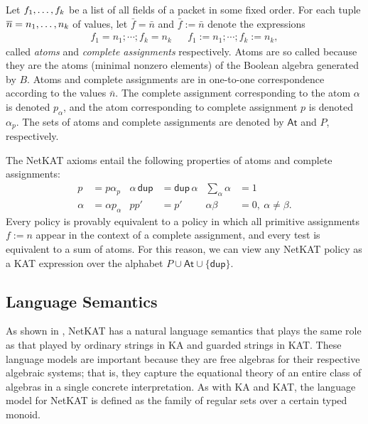 \documentclass{article}
\newcommand\cset[1]{\{#1\}}
\newcommand\CA{\ensuremath{P}}
\newcommand\At{\ensuremath{\mathsf{At}}}
\newcommand{\netkat}{NetKAT\xspace}
\newcommand{\kw}[1]{\ensuremath{\mathsf{#1}}}
\newcommand{\pdup}{\ensuremath{\mathrel{\kw{dup}}}}
\begin{document}
Let $f_{1},\ldots,f_{k}$ be a list of all fields of a packet in some fixed
order. For each tuple $\overline{n} = n_{1},\ldots,n_{k}$ of values, let $\bar
f=\bar n$ and $\bar f := \bar n$ denote the expressions
%
\begin{align*}
f_1=n_1;\cdots;f_k=n_k && f_1:=n_1;\cdots;f_k:=n_k,
\end{align*}
%
called \emph{atoms} and \emph{complete assignments} respectively. Atoms are so called
because they are the atoms (minimal nonzero elements)
of the Boolean algebra generated by $B$. Atoms and complete assignments are in one-to-one correspondence
according to the values $\bar n$. The complete assignment corresponding to
the atom $\alpha$ is denoted $p_\alpha$, and the atom corresponding to
complete assignment $p$ is denoted $\alpha_p$.  The sets of atoms and complete assignments are
denoted by $\At$ and \CA, respectively.

The \netkat axioms entail the following properties of atoms and complete
assignments:
\begin{align*}
p &= p\alpha_p & \alpha\,{\pdup} &= {\pdup}\,\alpha & \sum_\alpha \alpha &= 1\\
\alpha &= \alpha p_\alpha & pp' &= p' & \alpha\beta &= 0,\ \alpha\neq\beta.
\end{align*}
Every policy is provably equivalent to a policy in which all
primitive assignments $f:=n$ appear in the context of a
complete assignment, and every test is equivalent to a
sum of atoms. For this reason, we can view any \netkat policy as a
KAT expression over the alphabet $\CA\cup\At\cup\cset\pdup$.

\subsection{Language Semantics}
\label{sec:language}

As shown in \cite{AFGJKSW13a}, \netkat has a natural language semantics that plays the same role as that played by ordinary strings in KA and guarded strings in KAT. These language models are important because they are free algebras for their respective algebraic systems; that is, they capture the equational theory of an entire class of algebras in a single concrete interpretation. As with KA and KAT, the language model for \netkat is defined as the family of regular sets over a certain typed monoid.
\end{document}
